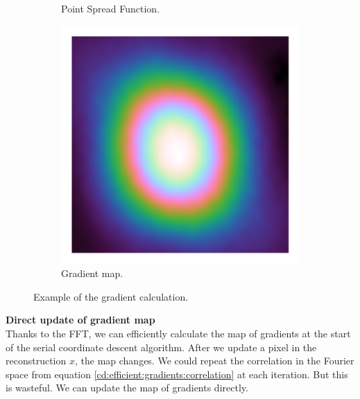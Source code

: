 \begin{figure}[h]
\begin{subfigure}[b]{0.3\linewidth}
		\caption{Point Spread Function.}
		\label{cd:efficient:gradients:psf}
	\end{subfigure}
	\begin{subfigure}[b]{0.3\linewidth}
		\includegraphics[width=\linewidth, clip, trim= 0.25in 0.25in 0.25in 0.25in]{./chapters/03.cd/simulated/gradients.png}
		\caption{Gradient map.}
		\label{cd:efficient:gradients:gradients}
	\end{subfigure}
	
	\caption{Example of the gradient calculation.}
	\label{cd:efficient:gradients:figure}
\end{figure}


\textbf{Direct update of gradient map}\\
Thanks to the FFT, we can efficiently calculate the map of gradients at the start of the serial coordinate descent algorithm. After we update a pixel in the reconstruction $x$, the map changes. We could repeat the correlation in the Fourier space from equation \eqref{cd:efficient:gradients:correlation} at each iteration. But this is wasteful. We can update the map of gradients directly.

